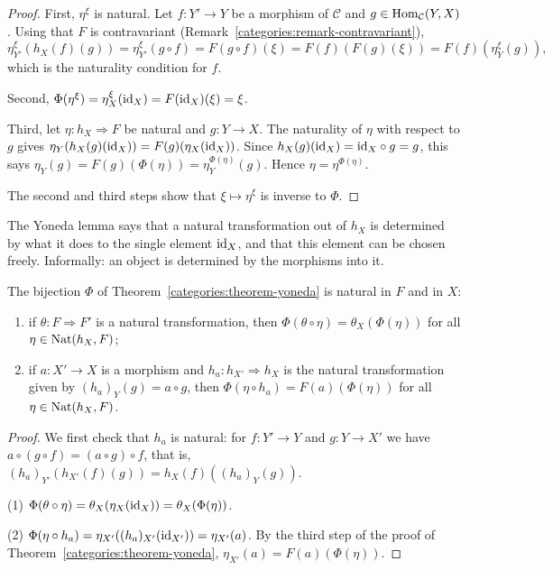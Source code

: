\begin{proof}
First, $\eta^\xi$ is natural. Let $f \colon Y' \to Y$ be a morphism of
$\mathcal{C}$ and $g \in \operatorname{Hom}_{\mathcal{C}}(Y, X)$. Using that $F$ is
contravariant (Remark~\ref{categories:remark-contravariant}),
\[
\eta^\xi_{Y'}(h_X(f)(g)) = \eta^\xi_{Y'}(g \circ f) = F(g \circ f)(\xi)
= F(f)(F(g)(\xi)) = F(f)(\eta^\xi_Y(g)),
\]
which is the naturality condition for $f$.

Second, $\Phi(\eta^\xi) = \eta^\xi_X(\mathrm{id}_X) = F(\mathrm{id}_X)(\xi) = \xi$.

Third, let $\eta \colon h_X \Rightarrow F$ be natural and $g \colon Y \to X$.
The naturality of $\eta$ with respect to $g$ gives
$\eta_Y(h_X(g)(\mathrm{id}_X)) = F(g)(\eta_X(\mathrm{id}_X))$. Since
$h_X(g)(\mathrm{id}_X) = \mathrm{id}_X \circ g = g$, this says
$\eta_Y(g) = F(g)(\Phi(\eta)) = \eta^{\Phi(\eta)}_Y(g)$. Hence
$\eta = \eta^{\Phi(\eta)}$.

The second and third steps show that $\xi \mapsto \eta^\xi$ is inverse to
$\Phi$.
\end{proof}

\begin{remark}\label{categories:remark-yoneda-meaning}
The Yoneda lemma says that a natural transformation out of $h_X$ is determined
by what it does to the single element $\mathrm{id}_X$, and that this element can be
chosen freely. Informally: an object is determined by the morphisms into it.
\end{remark}

\begin{proposition}\label{categories:proposition-yoneda-natural}
The bijection $\Phi$ of Theorem~\ref{categories:theorem-yoneda} is natural in
$F$ and in $X$:
\begin{enumerate}
\item if $\theta \colon F \Rightarrow F'$ is a natural transformation, then
$\Phi(\theta \circ \eta) = \theta_X(\Phi(\eta))$ for all
$\eta \in \operatorname{Nat}(h_X, F)$;
\item if $a \colon X' \to X$ is a morphism and $h_a \colon h_{X'} \Rightarrow h_X$
is the natural transformation given by $(h_a)_Y(g) = a \circ g$, then
$\Phi(\eta \circ h_a) = F(a)(\Phi(\eta))$ for all $\eta \in \operatorname{Nat}(h_X, F)$.
\end{enumerate}
\end{proposition}

\begin{proof}
We first check that $h_a$ is natural: for $f \colon Y' \to Y$ and
$g \colon Y \to X'$ we have $a \circ (g \circ f) = (a \circ g) \circ f$, that is,
$(h_a)_{Y'}(h_{X'}(f)(g)) = h_X(f)((h_a)_Y(g))$.

(1) $\Phi(\theta \circ \eta) = \theta_X(\eta_X(\mathrm{id}_X)) = \theta_X(\Phi(\eta))$.

(2) $\Phi(\eta \circ h_a) = \eta_{X'}((h_a)_{X'}(\mathrm{id}_{X'})) = \eta_{X'}(a)$. By
the third step of the proof of Theorem~\ref{categories:theorem-yoneda},
$\eta_{X'}(a) = F(a)(\Phi(\eta))$.
\end{proof}

